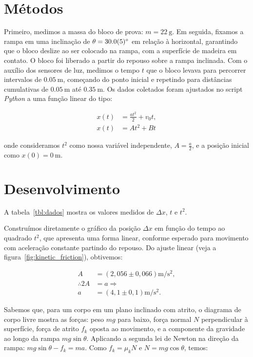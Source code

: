 \documentclass[10pt,oneside,twocolumn,a4paper]{article}
\begin{document}
\section{Métodos}

Primeiro, medimos a massa do bloco de prova: $m = \SI{22}{\gram}$. Em seguida,
fixamos a rampa em uma inclinação de $\theta = \SI{30 \pm 0.5}{\degree}$ em
relação à horizontal, garantindo que o bloco deslize ao ser colocado na rampa,
com a superfície de madeira em contato. O bloco foi liberado a partir do
repouso sobre a rampa inclinada. Com o auxílio dos sensores de luz, medimos o
tempo $t$ que o bloco levava para percorrer intervalos de $\SI{0.05}{\metre}$,
começando do ponto inicial e repetindo para distâncias cumulativas de
$\SI{0,05}{\metre}$ até $\SI{0.35}{\metre}$. Os dados coletados foram ajustados
no script \textit{Python} a uma função linear do tipo:

\begin{align*}
	x(t) &= \frac{at^2}{2} + v_0t, \\
	x(t) &= At^2 + Bt
\end{align*}

onde consideramos $t^2$ como nossa variável independente, $A = \frac{a}{2}$, e
a posição inicial como $x(0) = \SI{0}{\meter}$.

\section{Desenvolvimento}

A tabela~\ref{tbl:dados} mostra os valores medidos de $\Delta x$, $t$ e
$t^2$.

Construímos diretamente o gráfico da posição $\Delta x$ em função do tempo ao
quadrado $t^2$, que apresenta uma forma linear, conforme esperado para movimento
com aceleração constante partindo do repouso. Do ajuste linear
(veja a figura~\ref{fig:kinetic_friction}), obtivemos:

\begin{align}\label{eq:accel}
	A &= \left( 2,056 \pm 0,066 \right) \si{\metre\per\second\squared}, \nonumber \\
	\therefore 2A &= a \Rightarrow \nonumber \\
	a &= \left( 4,1 \pm 0,1 \right) \si{\metre\per\second\squared}.
\end{align}

Sabemos que, para um corpo em um plano inclinado com atrito, o diagrama de
corpo livre mostra as forças: peso $mg$ para baixo, força normal $N$
perpendicular à superfície, força de atrito $f_k$ oposta ao movimento, e a
componente da gravidade ao longo da rampa $mg \sin\theta$. Aplicando a segunda
lei de Newton na direção da rampa: $mg \sin\theta - f_k = ma$. Como $f_k =
\mu_k N$ e $N = mg \cos\theta$, temos:
\end{document}
